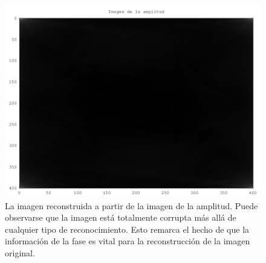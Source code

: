 \documentclass[twocolumn,a4paper,10pt]{article}
\begin{document}
\begin{figure}[H]
        \includegraphics[width=\linewidth]{../images/amplitudeRebuilt.png}
        \caption{La imagen reconstruida a partir de la imagen de la amplitud. Puede observarse que la imagen est\'a totalmente corrupta m\'as all\'a 
        de cualquier tipo de reconocimiento. Esto remarca el hecho de que la informaci\'on de la fase es vital para la reconstrucci\'on de la imagen original.}
        \label{fig:amplitudeRebuilt}
\end{figure}
\end{document}
